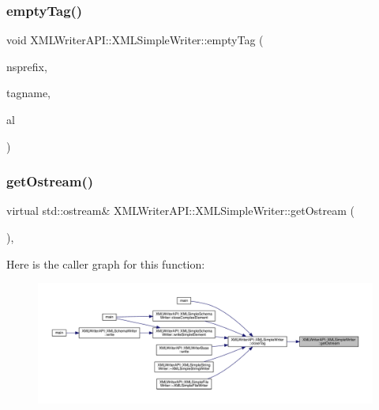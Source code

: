 \subsubsection{\texorpdfstring{emptyTag()}{emptyTag()}\hspace{0.1cm}{\footnotesize\ttfamily [8/8]}}
{\footnotesize\ttfamily void X\+M\+L\+Writer\+A\+P\+I\+::\+X\+M\+L\+Simple\+Writer\+::empty\+Tag (\begin{DoxyParamCaption}\item[{const std\+::string \&}]{nsprefix,  }\item[{const std\+::string \&}]{tagname,  }\item[{\mbox{\hyperlink{namespaceXMLWriterAPI_a28cf3d8051a4ccf0aef208b7ebc66d07}{Attribute\+List}} \&}]{al }\end{DoxyParamCaption})}

\mbox{\label{classXMLWriterAPI_1_1XMLSimpleWriter_aaf70b3dcddd7880e838bbc266426dfd5}} 
\subsubsection{\texorpdfstring{getOstream()}{getOstream()}\hspace{0.1cm}{\footnotesize\ttfamily [1/2]}}
{\footnotesize\ttfamily virtual std\+::ostream\& X\+M\+L\+Writer\+A\+P\+I\+::\+X\+M\+L\+Simple\+Writer\+::get\+Ostream (\begin{DoxyParamCaption}{ }\end{DoxyParamCaption})\hspace{0.3cm}{\ttfamily [protected]}, {}}

Here is the caller graph for this function\+:\nopagebreak
\begin{figure}[H]
\begin{center}
\leavevmode
\includegraphics[width=350pt]{d5/de1/classXMLWriterAPI_1_1XMLSimpleWriter_aaf70b3dcddd7880e838bbc266426dfd5_icgraph}
\end{center}
\end{figure}
\mbox{\label{classXMLWriterAPI_1_1XMLSimpleWriter_aaf70b3dcddd7880e838bbc266426dfd5}} 
